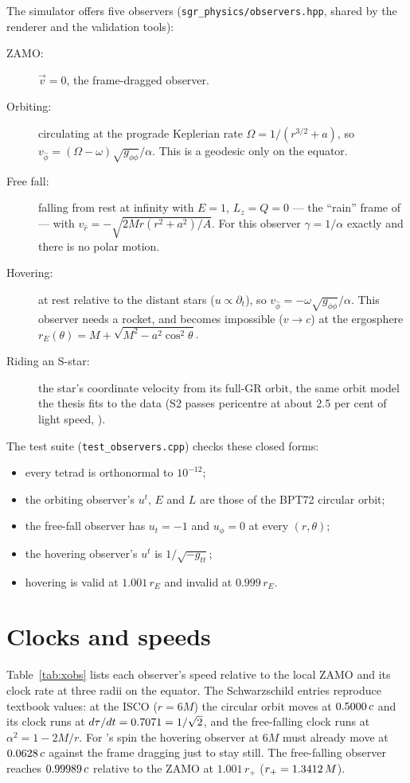 The simulator offers five observers (\texttt{sgr\_physics/observers.hpp},
shared by the renderer and the validation tools):
\begin{description}
\item[ZAMO:] $\vec v = 0$, the frame-dragged observer.
\item[Orbiting:] circulating at the prograde Keplerian rate
$\Omega = 1/(r^{3/2} + a)$, so $v_{\hat\phi} = (\Omega - \omega)\sqrt{g_{\phi\phi}}/\alpha$.
This is a geodesic only on the equator.
\item[Free fall:] falling from rest at infinity with $E = 1$, $L_z = Q = 0$
--- the ``rain'' frame of \citet{HamiltonLisle2008} --- with
$v_{\hat r} = -\sqrt{2Mr(r^2+a^2)/A}$. For this observer $\gamma = 1/\alpha$
exactly and there is no polar motion.
\item[Hovering:] at rest relative to the distant stars ($u \propto
\partial_t$), so $v_{\hat\phi} = -\omega\sqrt{g_{\phi\phi}}/\alpha$. This
observer needs a rocket, and becomes impossible ($v \to c$) at the
ergosphere $r_E(\theta) = M + \sqrt{M^2 - a^2\cos^2\theta}$.
\item[Riding an S-star:] the star's coordinate velocity from its full-GR
orbit, the same orbit model the thesis fits to the data (S2 passes
pericentre at about 2.5 per cent of light speed, \citealp{Gravity2018}).
\end{description}

The test suite (\texttt{test\_observers.cpp}) checks these closed forms:
\begin{itemize}
\item every tetrad is orthonormal to $10^{-12}$;
\item the orbiting observer's $u^t$, $E$ and $L$ are those of the BPT72
circular orbit;
\item the free-fall observer has $u_t = -1$ and $u_\phi = 0$ at every
$(r, \theta)$;
\item the hovering observer's $u^t$ is $1/\sqrt{-g_{tt}}$;
\item hovering is valid at $1.001\,r_E$ and invalid at $0.999\,r_E$.
\end{itemize}

\section{Clocks and speeds}

Table~\ref{tab:xobs} lists each observer's speed relative to the local ZAMO
and its clock rate at three radii on the equator. The Schwarzschild entries
reproduce textbook values: at the ISCO ($r = 6M$) the circular orbit moves at
$0.5000\,c$ and its clock runs at $d\tau/dt = 0.7071 =
1/\sqrt2$, and the free-falling clock runs at $\alpha^2 = 1 - 2M/r$. For
\sgra's spin the hovering observer at $6M$ must already move at
$0.0628\,c$ against the frame dragging just to stay still. The
free-falling observer reaches $0.99989\,c$ relative to the ZAMO
at $1.001\,r_+$ ($r_+ = 1.3412\,M$).

